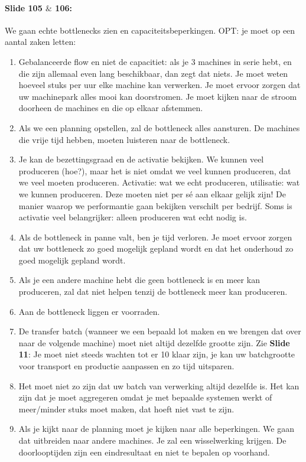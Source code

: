 \documentclass[10pt,a4paper]{report}
\begin{document}
\paragraph{Slide 105 $\&$ 106:} We gaan echte bottlenecks zien en capaciteitsbeperkingen.
OPT: je moet op een aantal zaken letten:
\begin{enumerate}
\item Gebalanceerde flow en niet de capacitiet: als je 3 machines in serie hebt, en die zijn allemaal even lang beschikbaar, dan zegt dat niets. Je moet weten hoeveel stuks per uur elke machine kan verwerken. Je moet ervoor zorgen dat uw machinepark alles mooi kan doorstromen. Je moet kijken naar de stroom doorheen de machines en die op elkaar afstemmen.
\item Als we een planning opstellen, zal de bottleneck alles aansturen. De machines die vrije tijd hebben, moeten luisteren naar de bottleneck.
\item Je kan de bezettingsgraad en de activatie bekijken. We kunnen veel produceren (hoe?), maar het is niet omdat we veel kunnen produceren, dat we veel moeten produceren. Activatie: wat we echt produceren, utilisatie: wat we kunnen produceren. Deze moeten niet per s\'e aan elkaar gelijk zijn! De manier waarop we performantie gaan bekijken verschilt per bedrijf. Soms is activatie veel belangrijker: alleen produceren wat echt nodig is.
\item Als de bottleneck in panne valt, ben je tijd verloren. Je moet ervoor zorgen dat uw bottleneck zo goed mogelijk gepland wordt en dat het onderhoud zo goed mogelijk gepland wordt.
\item Als je een andere machine hebt die geen bottleneck is en meer kan produceren, zal dat niet helpen tenzij de bottleneck meer kan produceren.
\item Aan de bottleneck liggen er voorraden.
\item De transfer batch (wanneer we een bepaald lot maken en we brengen dat over naar de volgende machine) moet niet altijd dezelfde grootte zijn. Zie \textbf{Slide 11}: Je moet niet steeds wachten tot er 10 klaar zijn, je kan uw batchgrootte voor transport en productie aanpassen en zo tijd uitsparen.
\item Het moet niet zo zijn dat uw batch van verwerking altijd dezelfde is. Het kan zijn dat je moet aggregeren omdat je met bepaalde systemen werkt of meer/minder stuks moet maken, dat hoeft niet vast te zijn.
\item Als je kijkt naar de planning moet je kijken naar alle beperkingen. We gaan dat uitbreiden naar andere machines. Je zal een wisselwerking krijgen. De doorlooptijden zijn een eindresultaat en niet te bepalen op voorhand.
\end{enumerate}
\end{document}
